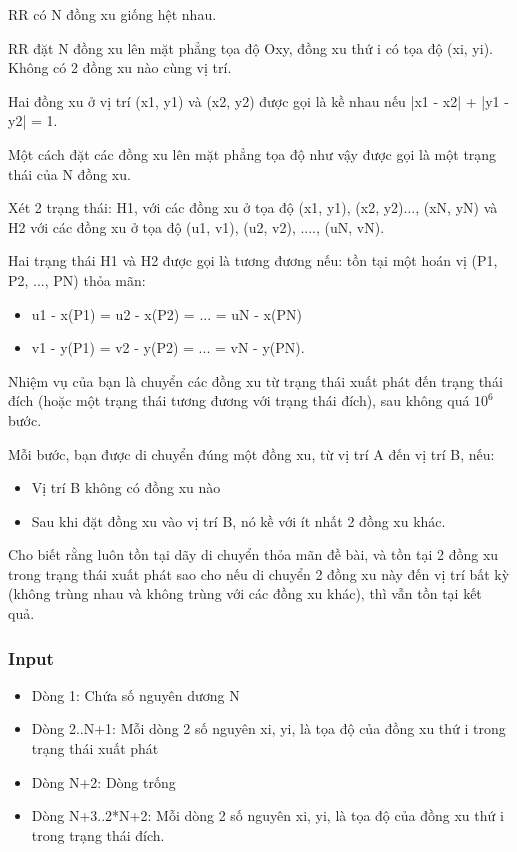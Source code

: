 



   RR có N đồng xu giống hệt nhau.  

    RR đặt N đồng xu lên mặt phẳng tọa độ Oxy, đồng xu thứ i có tọa độ (xi, yi). Không có 2 đồng xu nào cùng vị trí.   

   Hai đồng xu ở vị trí (x1, y1) và (x2, y2) được gọi là kề nhau nếu |x1 - x2| + |y1 - y2| = 1.  

   Một cách đặt các đồng xu lên mặt phẳng tọa độ như vậy được gọi là một trạng thái của N đồng xu.  

   Xét 2 trạng thái: H1, với các đồng xu ở tọa độ (x1, y1), (x2, y2)..., (xN, yN) và H2 với các đồng xu ở tọa độ (u1, v1), (u2, v2), ...., (uN, vN).  

   Hai trạng thái H1 và H2 được gọi là tương đương nếu: tồn tại một hoán vị (P1, P2, ..., PN) thỏa mãn:  
\begin{itemize}
	\item     u1 - x(P1) = u2 - x(P2) = ... = uN - x(PN)   
	\item     v1 - y(P1) = v2 - y(P2) = ... = vN - y(PN).   
\end{itemize}

   Nhiệm vụ của bạn là chuyển các đồng xu từ trạng thái xuất phát đến trạng thái đích (hoặc một trạng thái tương đương với trạng thái đích), sau không quá $10^{6}$   bước.  

   Mỗi bước, bạn được di chuyển đúng một đồng xu, từ vị trí A đến vị trí B, nếu:  
\begin{itemize}
	\item     Vị trí B không có đồng xu nào   
	\item     Sau khi đặt đồng xu vào vị trí B, nó kề với ít nhất 2 đồng xu khác.   
\end{itemize}

   Cho biết rằng luôn tồn tại dãy di chuyển thỏa mãn đề bài, và tồn tại 2 đồng xu trong trạng thái xuất phát sao cho nếu di chuyển 2 đồng xu này đến vị trí bất kỳ (không trùng nhau và không trùng với các đồng xu khác), thì vẫn tồn tại kết quả.  

\subsubsection{   Input  }
\begin{itemize}
	\item     Dòng 1: Chứa số nguyên dương N   
	\item     Dòng 2..N+1: Mỗi dòng 2 số nguyên xi, yi, là tọa độ của đồng xu thứ i trong trạng thái xuất phát   
	\item     Dòng N+2: Dòng trống   
	\item     Dòng N+3..2*N+2: Mỗi dòng 2 số nguyên xi, yi, là tọa độ của đồng xu thứ i trong trạng thái đích.   
\end{itemize}

